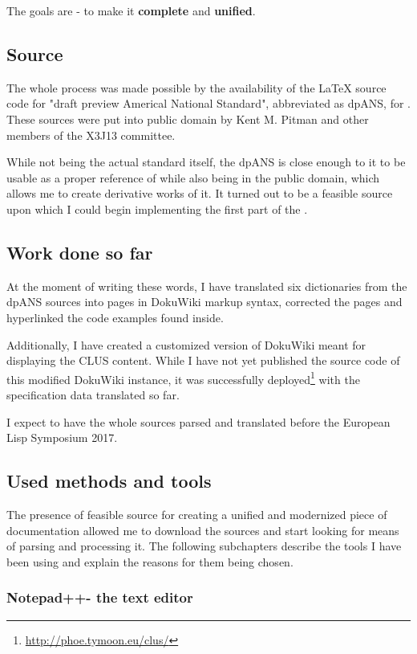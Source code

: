 The goals are - to make it \textbf{complete} and \textbf{unified}.

\subsection{Source}

The whole process was made possible by the availability of the \LaTeX{} source code for "draft preview Americal National Standard", abbreviated as dpANS, for \cl{}. These sources were put into public domain by Kent M. Pitman and other members of the X3J13 committee.

While not being the actual standard itself, the dpANS is close enough to it to be usable as a proper reference of \cl{} while also being in the public domain, which allows me to create derivative works of it. It turned out to be a feasible source upon which I could begin implementing the first part of the \us{}.

\subsection{Work done so far}

At the moment of writing these words, I have translated six dictionaries from the dpANS sources into pages in DokuWiki markup syntax, corrected the pages and hyperlinked the code examples found inside.

Additionally, I have created a customized version of DokuWiki meant for displaying the CLUS content. While I have not yet published the source code of this modified DokuWiki instance, it was successfully deployed\footnote{\url{http://phoe.tymoon.eu/clus/}} with the specification data translated so far.

I expect to have the whole sources parsed and translated before the European Lisp Symposium 2017.

\subsection{Used methods and tools}

The presence of feasible source for creating a unified and modernized piece of \cl{} documentation allowed me to download the sources and start looking for means of parsing and processing it. The following subchapters describe the tools I have been using and explain the reasons for them being chosen.

\subsubsection{Notepad++- the text editor}

